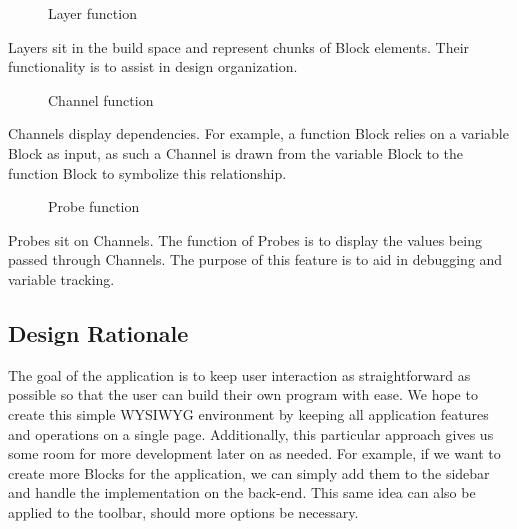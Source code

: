 \documentclass[journal,10pt,onecolumn,compsoc]{IEEEtran} \usepackage[margin=1.0in]{geometry} \usepackage{pdfpages}
\begin{document}
\begin{figure}[H]
\centering
{}
\caption{Layer function}
\end{figure}

\noindent Layers sit in the build space and represent chunks of Block elements.
Their functionality is to assist in design organization.

\begin{figure}[H]
\centering
{}
\caption{Channel function}
\end{figure}

\noindent Channels display dependencies. 
For example, a function Block relies on a variable Block as input, as such a Channel is drawn from the variable Block to the function Block to symbolize this relationship. 

\begin{figure}[H]
\centering
{}
\caption{Probe function}
\end{figure}

\noindent Probes sit on Channels. 
The function of Probes is to display the values being passed through Channels.
The purpose of this feature is to aid in debugging and variable tracking.
\subsection{Design Rationale}
\noindent The goal of the application is to keep user interaction as straightforward as possible so that the user can build their own program with ease. 
We hope to create this simple WYSIWYG environment by keeping all application features and operations on a single page. 
Additionally, this particular approach gives us some room for more development later on as needed. 
For example, if we want to create more Blocks for the application, we can simply add them to the sidebar and handle the implementation on the back-end. 
This same idea can also be applied to the toolbar, should more options be necessary.
\end{document}
